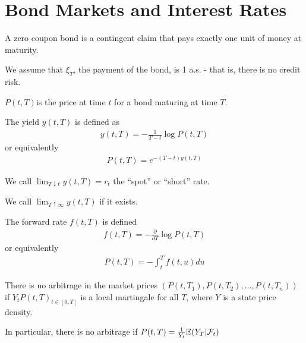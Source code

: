 \chapter{Bond Markets and Interest Rates}
\label{cha:bond-mark-inter}

\begin{defn}
  \label{defn:bond_markets:1}
  A zero coupon bond is a contingent claim that pays exactly one unit
  of money at maturity.

  We assume that $\xi_{T}$, the payment of the bond, is 1 a.s. - that
  is, there is no credit risk.
\end{defn}

\begin{defn}
  \label{defn:bond_markets:3} $P(t, T)$is the price at time $t$ for a
  bond maturing at time $T$.
\end{defn}

\begin{defn}
  \label{defn:bond_markets:4}
  The yield $y(t, T)$ is defined as
  \begin{align}
    \label{eq:145}
    y(t, T) = - \frac{1}{T - t} \log P(t, T)
  \end{align} or equivalently
  \begin{align}
    \label{eq:146}
    P(t, T)= e^{-(T-t) y(t, T)}
  \end{align}
\end{defn}

\begin{defn}
  \label{defn:bond_markets:5}
  We call $\lim_{T \downarrow t} y(t, T) = r_{t}$ the ``spot'' or
  ``short'' rate.

  We call $\lim_{T \uparrow \infty} y(t, T)$ if it exists.
\end{defn}

\begin{defn}
  \label{defn:bond_markets:6}
  The forward rate $f(t, T)$ is defined
  \begin{align}
    \label{eq:147}
    f(t, T) = - \frac{\partial}{\partial T} \log P(t, T)
  \end{align} or equivalently
  \begin{align}
    \label{eq:148}
    P(t, T) = - \int_{t}^{T} f(t, u) du
  \end{align}
\end{defn}

\begin{thm}
  \label{defn:bond_markets:2}
  There is no arbitrage in the market prices $(P(t, T_{1}), P(t,
  T_{2}), \dots, P(t, T_{n}))$ if $Y_{t} P(t, T)_{t \in [0, T]}$ is a local
  martingale  for all $T$, where $Y$ is a state price
  density.

  In particular, there is no arbitrage if $P(t, T) = \frac{1}{Y_{t}}
  \E{Y_{T} | \mathcal{F}_{t}}$
\end{thm}

